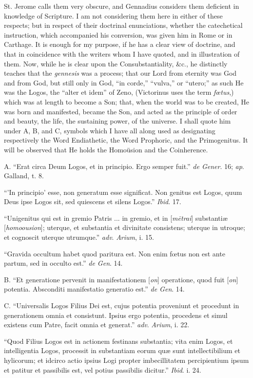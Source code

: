 St. Jerome calls them very obscure, and Gennadius considers them
deficient in knowledge of Scripture. I am not considering them here in
either of these respects; but in respect of their doctrinal
enunciations, whether the catechetical instruction, which accompanied
his conversion, was given him in Rome or in Carthage. It is enough for
my purpose, if he has a clear view of doctrine, and that in
coincidence with the writers whom I have quoted, and in illustration
of them. Now, while he is clear upon the Consubstantiality, \&c.,
he distinctly teaches that the \emph{gennesis} was a process; that our
Lord from eternity was God and from God, but still only in God,
``in corde,'' ``vulva,'' or ``utero;'' as such
He was the Logos, the ``alter et idem'' of Zeno, (Victorinus
uses the term \emph{fœtus},) which was at length to become a Son;
that, when the world was to be created, He was born and manifested,
became the Son, and acted as the principle of order and beauty, the
life, the sustaining power, of the universe. I shall quote him under
A, B, and C, symbols which I have all along used as designating
respectively the Word Endiathetic, the Word Prophoric, and the
Primogenitus. It will be observed that He holds the Homoüsion and the
Coinherence.

A. ``Erat circa Deum Logos, et in principio. Ergo semper fuit.''
\emph{de Gener}. 16; \emph{ap}. Galland, t. 8.

``'In principio' esse, non generatum esse significat. Non
genitus est Logos, quum Deus ipse Logos sit, sed quiescens et silens
Logos.'' \emph{Ibid}. 17.

``Unigenitus qui est in gremio Patris ... in gremio, et in [\emph{m\={e}trai}]
substantiæ [\emph{homoousion}]; uterque, et substantia et divinitate
consistens; uterque in utroque; et cognoscit uterque utrumque.'' \emph{adv}.
\emph{Arium}, i. 15.

``Gravida occultum habet quod paritura est. Non enim fœtus non
est ante partum, sed in occulto est.'' \emph{de Gen}. 14.

B. ``Et generatione pervenit in manifestationem [\emph{on}]
operatione, quod fuit [\emph{on}] potentia. Absconditi manifestatio
generatio est.'' \emph{de Gen}. 14.

C. ``Universalis Logos Filius Dei est, cujus potentia
proveniunt et procedunt in generationem omnia et consistunt. Ipsius
ergo potentia, procedens et simul existens cum Patre, facit omnia et
generat.'' \emph{adv}. \emph{Arium}, i. 22.

``Quod Filius Logos est in actionem festinans substantia; vita
enim Logos, et intelligentia Logos, processit in substantiam eorum quæ
sunt intellectibilium et hylicorum; et idcirco actio ipsius Logi
propter imbecillitatem percipientium ipsum et patitur et passibilis
est, vel potius passibilis dicitur.'' \emph{Ibid}. i. 24.

